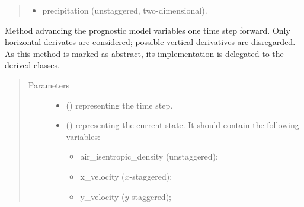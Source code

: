 \documentclass[letterpaper,10pt,english]{sphinxmanual}
\begin{document}
\begin{fulllineitems}
\begin{fulllineitems}
\begin{quote}
\begin{description}
\begin{itemize}
\begin{itemize}
\item {} 
precipitation (unstaggered, two-dimensional).

\end{itemize}

\end{itemize}


\end{description}\end{quote}

\end{fulllineitems}


\begin{fulllineitems}
\label{\detokenize{api:dycore.prognostic_isentropic_nonconservative.PrognosticIsentropicNonconservative.step_neglecting_vertical_advection}}
Method advancing the prognostic model variables one time step forward.
Only horizontal derivates are considered; possible vertical derivatives are disregarded.
As this method is marked as abstract, its implementation is delegated to the derived classes.
\begin{quote}\begin{description}
\item[{Parameters}] \leavevmode\begin{itemize}
\item {} 
 () \textendash{}  representing the time step.

\item {} 
 () \textendash{} 
{\hyperref[\detokenize{api:storages.state_isentropic.StateIsentropic}]{}} representing the current state.
It should contain the following variables:
\begin{itemize}
\item {} 
air\_isentropic\_density (unstaggered);

\item {} 
x\_velocity (\(x\)-staggered);

\item {} 
y\_velocity (\(y\)-staggered);


\end{itemize}
\end{itemize}
\end{description}
\end{quote}
\end{fulllineitems}
\end{fulllineitems}
\end{document}
